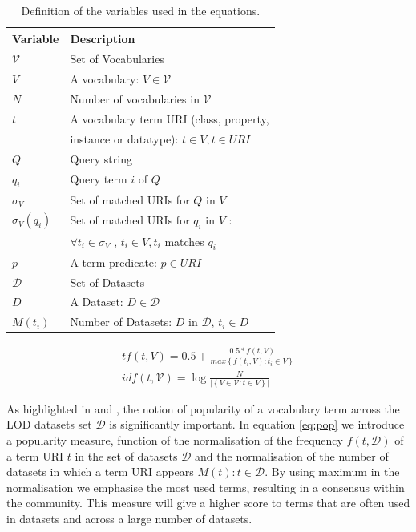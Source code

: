 \documentclass{iosart2c}
\begin{document}
\begin{table}[h!tb]
\caption{Definition of the variables used in the equations.}
\label{tab:variable}
\begin{tabular}{|l|l|}
  \hline
  \textbf{Variable} & \textbf{Description} \\ \hline
  $\mathcal{V}$ & Set of Vocabularies \\ \hline
  $V$ & A vocabulary: $V \in \mathcal{V}$ \\ \hline
  $N$ & Number of vocabularies in $\mathcal{V}$ \\ \hline
  $t$ & A vocabulary term URI (class, property, \\
       &  instance or datatype): $t \in V, t \in URI$ \\ \hline
  $Q$ & Query string \\ \hline
  $q_i$ & Query term $i$ of $Q$ \\ \hline
  $\sigma_V$ & Set of matched URIs for $Q$ in $V$ \\ \hline
  $\sigma_V(q_i)$ & Set of matched URIs for $q_i$ in $V$ : \\
         & $\forall t_i \in \sigma_V$ , $t_i \in V ,  t_i$ matches $q_i$ \\ \hline
  $p$ & A term predicate: $p \in URI$ \\ \hline
  $\mathcal{D}$ & Set of Datasets \\ \hline
  $D$ & A Dataset: $D \in \mathcal{D}$ \\ \hline
  $M(t_i)$ & Number of Datasets: $D$ in $\mathcal{D}$, $t_i \in D$ \\ \hline
\end{tabular}
\end{table}

\begin{equation}\label{eq:tfidf}
\begin{split}
tf(t,V) =0.5+ \frac{0.5 * f(t,V)}{max\left\{f(t_i,V): t_i \in V\right\}} \\
idf(t,\mathcal{V}) =\log\frac{N}{|\left\{V \in \mathcal{V}: t \in V\right\}|}
\end{split}
\end{equation}
 

As highlighted in \cite{butt2014} and \cite{schaible2013lover}, the notion of popularity of a vocabulary term across the LOD datasets set $\mathcal{D}$ is significantly important. In equation \ref{eq:pop} we introduce a popularity measure, function of the normalisation of the frequency $f(t,\mathcal{D})$ of a term URI $t$ in the set of datasets $\mathcal{D}$ and the normalisation of the number of datasets in which a term URI appears $M(t): t \in \mathcal{D}$. By using maximum in the normalisation we emphasise the most used terms, resulting in a consensus within the community. This measure will give a higher score to terms that are often used in datasets and across a large number of datasets.
\end{document}

